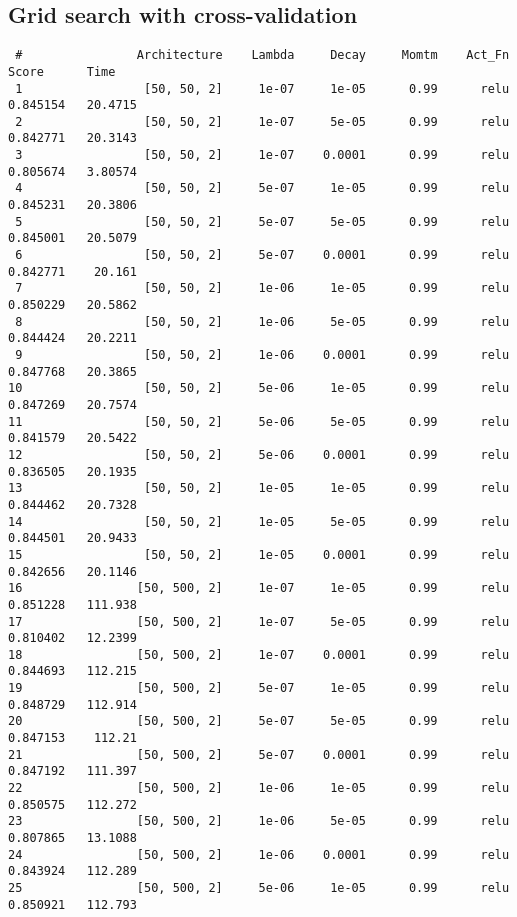 \documentclass[letter,doc,notimes]{article}
\begin{document}
\subsection{Grid search with cross-validation}
\begin{verbatim}
 #                Architecture    Lambda     Decay     Momtm    Act_Fn     Score      Time
 1                 [50, 50, 2]     1e-07     1e-05      0.99      relu  0.845154   20.4715
 2                 [50, 50, 2]     1e-07     5e-05      0.99      relu  0.842771   20.3143
 3                 [50, 50, 2]     1e-07    0.0001      0.99      relu  0.805674   3.80574
 4                 [50, 50, 2]     5e-07     1e-05      0.99      relu  0.845231   20.3806
 5                 [50, 50, 2]     5e-07     5e-05      0.99      relu  0.845001   20.5079
 6                 [50, 50, 2]     5e-07    0.0001      0.99      relu  0.842771    20.161
 7                 [50, 50, 2]     1e-06     1e-05      0.99      relu  0.850229   20.5862
 8                 [50, 50, 2]     1e-06     5e-05      0.99      relu  0.844424   20.2211
 9                 [50, 50, 2]     1e-06    0.0001      0.99      relu  0.847768   20.3865
10                 [50, 50, 2]     5e-06     1e-05      0.99      relu  0.847269   20.7574
11                 [50, 50, 2]     5e-06     5e-05      0.99      relu  0.841579   20.5422
12                 [50, 50, 2]     5e-06    0.0001      0.99      relu  0.836505   20.1935
13                 [50, 50, 2]     1e-05     1e-05      0.99      relu  0.844462   20.7328
14                 [50, 50, 2]     1e-05     5e-05      0.99      relu  0.844501   20.9433
15                 [50, 50, 2]     1e-05    0.0001      0.99      relu  0.842656   20.1146
16                [50, 500, 2]     1e-07     1e-05      0.99      relu  0.851228   111.938
17                [50, 500, 2]     1e-07     5e-05      0.99      relu  0.810402   12.2399
18                [50, 500, 2]     1e-07    0.0001      0.99      relu  0.844693   112.215
19                [50, 500, 2]     5e-07     1e-05      0.99      relu  0.848729   112.914
20                [50, 500, 2]     5e-07     5e-05      0.99      relu  0.847153    112.21
21                [50, 500, 2]     5e-07    0.0001      0.99      relu  0.847192   111.397
22                [50, 500, 2]     1e-06     1e-05      0.99      relu  0.850575   112.272
23                [50, 500, 2]     1e-06     5e-05      0.99      relu  0.807865   13.1088
24                [50, 500, 2]     1e-06    0.0001      0.99      relu  0.843924   112.289
25                [50, 500, 2]     5e-06     1e-05      0.99      relu  0.850921   112.793

\end{verbatim}
\end{document}

